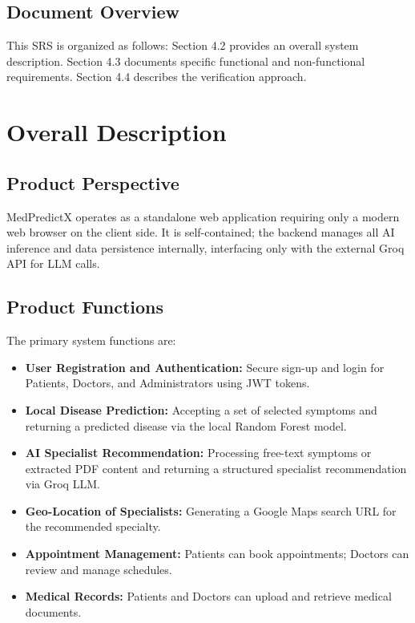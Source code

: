 \subsection{Document Overview}
This SRS is organized as follows: Section 4.2 provides an overall system description. Section 4.3 documents specific functional and non-functional requirements. Section 4.4 describes the verification approach.

\section{Overall Description}

\subsection{Product Perspective}
MedPredictX operates as a standalone web application requiring only a modern web browser on the client side. It is self-contained; the backend manages all AI inference and data persistence internally, interfacing only with the external Groq API for LLM calls.

\subsection{Product Functions}
The primary system functions are:
\begin{itemize}
    \item \textbf{User Registration and Authentication:} Secure sign-up and login for Patients, Doctors, and Administrators using JWT tokens.
    \item \textbf{Local Disease Prediction:} Accepting a set of selected symptoms and returning a predicted disease via the local Random Forest model.
    \item \textbf{AI Specialist Recommendation:} Processing free-text symptoms or extracted PDF content and returning a structured specialist recommendation via Groq LLM.
    \item \textbf{Geo-Location of Specialists:} Generating a Google Maps search URL for the recommended specialty.
    \item \textbf{Appointment Management:} Patients can book appointments; Doctors can review and manage schedules.
    \item \textbf{Medical Records:} Patients and Doctors can upload and retrieve medical documents.
\end{itemize}

